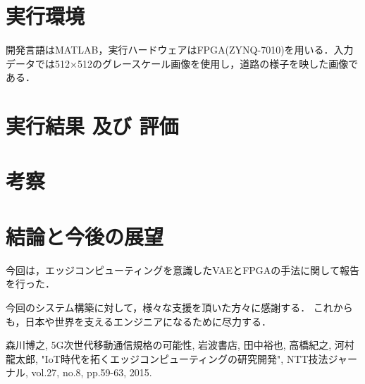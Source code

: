 \documentclass[paper]{ieicej}
\begin{document}
\section{実行環境}
開発言語はMATLAB，実行ハードウェアはFPGA(ZYNQ-7010)を用いる．入力データでは512×512のグレースケール画像を使用し，道路の様子を映した画像である．

\section{実行結果 及び 評価}

\section{考察}

\section{結論と今後の展望}
今回は，エッジコンピューティングを意識したVAEとFPGAの手法に関して報告を行った．

\ack
今回のシステム構築に対して，様々な支援を頂いた方々に感謝する．
これからも，日本や世界を支えるエンジニアになるために尽力する．
%
%
\begin{thebibliography}{99}%
森川博之, 5G次世代移動通信規格の可能性, 岩波書店, 
田中裕也, 高橋紀之, 河村龍太郎, "IoT時代を拓くエッジコンピューティングの研究開発", NTT技法ジャーナル, vol.27, no.8, pp.59-63, 2015.
\end{thebibliography}
\end{document}
